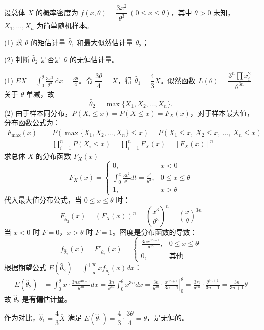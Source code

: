 \documentclass[lang=cn,11pt]{elegantbook}
\begin{document}
\begin{exercise}\label{exer:7-mono-3x2}
设总体 \(X\) 的概率密度为 \(f(x,\theta) = \dfrac{3x^2}{\theta^3}\ (0 \leq x \leq \theta)\)，其中 \(\theta > 0\) 未知，\(X_1, \dots, X_n\) 为简单随机样本。\par
(1) 求 \(\theta\) 的矩估计量 \(\hat{\theta}_1\) 和最大似然估计量 \(\hat{\theta}_2\)；\par
(2) 判断 \(\hat{\theta}_2\) 是否是 \(\theta\) 的无偏估计量。
\end{exercise}
\begin{solution}
(1) \(EX = \displaystyle\int_0^\theta \frac{3x^3}{\theta^3}\,\mathrm{d}x = \frac{3\theta}{4}\)。令 \(\dfrac{3\theta}{4} = \overline{X}\)，得 \(\hat{\theta}_1 = \dfrac{4}{3}\overline{X}\)。似然函数 \(L(\theta) = \dfrac{3^n\prod x_i^2}{\theta^{3n}}\) 关于 \(\theta\) 单减，故
\[
\hat{\theta}_2 = \max\{X_1, X_2, \dots, X_n\}.
\]
(2) 由于样本同分布，$P(X_i \le x) = P(X \le x) = F_X(x)$，对于样本最大值，分布函数公式为：
\begin{align*}
F_{\max}(x) &= P\left(\max\{X_1,X_2,\dots,X_n\} \leq x\right) = P\left(X_1 \leq x,\ X_2 \leq x,\ \dots,\ X_n \leq x\right)\\
&= \prod_{i=1}^n P(X_i \leq x) = \prod_{i=1}^n F_X(x) = \left[F_X(x)\right]^n
\end{align*}
求总体 $X$ 的分布函数 $F_X(x)$
$$F_X(x) =
\begin{cases}
0, & x<0 \\
\displaystyle \int_{0}^{x} \frac{3t^2}{\theta^3} dt = \frac{x^3}{\theta^3}, & 0\leq x\leq\theta \\
1, & x>\theta
\end{cases}$$
代入最大值分布公式，当 $0\leq x\leq\theta$ 时：
$$F_{\hat{\theta}_2}(x) = \left(F_X(x)\right)^n = \left(\frac{x^3}{\theta^3}\right)^n = \left(\frac{x}{\theta}\right)^{3n}$$
当 $x<0$ 时 $F=0$，$x>\theta$ 时 $F=1$。密度是分布函数的导数：
$$f_{\hat{\theta}_2}(x) = F'_{\hat{\theta}_2}(x) =\begin{cases}\displaystyle \frac{3n x^{3n-1}}{\theta^{3n}}, & 0\leq x\leq\theta \\0, & \text{其他}\end{cases}$$
根据期望公式 $E(\hat{\theta}_2) = \int_{-\infty}^{+\infty} x f_{\hat{\theta}_2}(x) dx$：
$$\begin{aligned}
E(\hat{\theta}_2) &= \int_{0}^{\theta} x \cdot \frac{3n x^{3n-1}}{\theta^{3n}} dx = \frac{3n}{\theta^{3n}} \int_{0}^{\theta} x^{3n} dx = \frac{3n}{\theta^{3n}} \cdot \left. \frac{x^{3n+1}}{3n+1} \right|_{0}^{\theta} = \frac{3n}{\theta^{3n}} \cdot \frac{\theta^{3n+1}}{3n+1} = \frac{3n}{3n+1} \theta
\end{aligned}$$
故 \(\hat{\theta}_2\) 是\textbf{有偏}估计量。
\begin{note}
作为对比，\(\hat{\theta}_1 = \dfrac{4}{3}\overline{X}\) 满足 \(E(\hat{\theta}_1) = \dfrac{4}{3}\cdot\dfrac{3\theta}{4} = \theta\)，是无偏的。
\end{note}
\end{solution}
\end{document}
